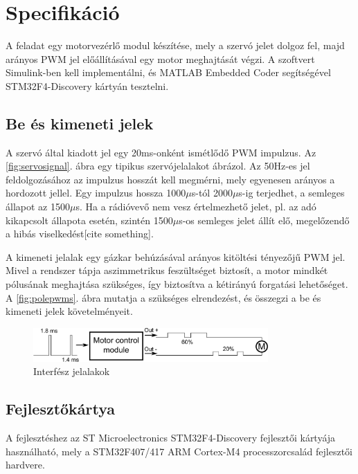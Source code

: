 \section*{Specifikáció}
A feladat egy motorvezérlő modul készítése, mely a szervó jelet dolgoz fel, majd arányos PWM jel előállításával egy motor meghajtását végzi. A szoftvert Simulink-ben kell implementálni, és MATLAB Embedded Coder segítségével STM32F4-Discovery kártyán tesztelni.

\subsection*{Be és kimeneti jelek}

A szervó által kiadott jel egy 20ms-onként ismétlődő PWM impulzus. Az \ref{fig:servosignal}. ábra egy tipikus szervójelalakot ábrázol. Az 50Hz-es jel feldolgozásához az impulzus hosszát kell megmérni, mely egyenesen arányos a hordozott jellel. Egy impulzus hossza 1000$\mu$s-tól 2000$\mu$s-ig terjedhet, a semleges állapot az 1500$\mu$s\cite{servobook}. Ha a rádióvevő nem vesz értelmezhető jelet, pl. az adó kikapcsolt állapota esetén, szintén 1500$\mu$s-os semleges jelet állít elő, megelőzendő a hibás viselkedést[cite something].

A kimeneti jelalak egy gázkar behúzásával arányos kitöltési tényezőjű PWM jel. Mivel a rendszer tápja aszimmetrikus feszültséget biztosít, a motor mindkét pólusának meghajtása szükséges, így biztosítva a kétirányú forgatási lehetőséget. A \ref{fig:polepwms}. ábra mutatja a szükséges elrendezést, és összegzi a be és kimeneti jelek követelményeit.

\begin{figure}[H]
	\centering
	\includegraphics[width=0.8\textwidth]{fig/motc}
	\caption{Interfész jelalakok}
	\label{fig:motc}
\end{figure}

\subsection*{Fejlesztőkártya}

A fejlesztéshez az ST Microelectronics STM32F4-Discovery fejlesztői kártyája használható, mely a STM32F407/417 ARM Cortex-M4 processzorcsalád fejlesztői hardvere\cite{discoverymanual}.

